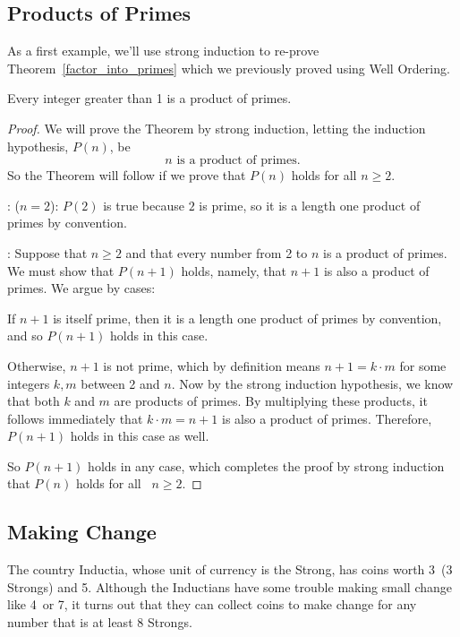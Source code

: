 \subsection{Products of Primes}

As a first example, we'll use strong induction to re-prove
Theorem~\ref{factor_into_primes} which we previously proved using Well
Ordering.

\begin{theorem*}%
Every integer greater than 1 is a product of primes.
\end{theorem*}

\begin{proof}
We will prove the Theorem by strong induction, letting the induction 
hypothesis, $P(n)$, be
\[
n \text{ is a product of primes}.
\]
So the Theorem will follow if we prove that $P(n)$ holds for all $n
\geq 2$.

: ($n=2$): $P(2)$ is true because $2$ is prime, so it is
a length one product of primes by convention.

: Suppose that $n \geq 2$ and that every
number from 2 to $n$ is a product of primes.  We must show that
$P(n+1)$ holds, namely, that $n+1$ is also a product of primes.  We
argue by cases:

If $n+1$ is itself prime, then it is a length one product of primes by
convention, and so $P(n+1)$ holds in this case.

Otherwise, $n + 1$ is not prime, which by definition means $n+1 =
k\cdot m$ for some integers $k,m$ between 2 and $n$.  Now by the
strong induction hypothesis, we know that both $k$ and $m$ are
products of primes.  By multiplying these products, it follows
immediately that $k\cdot m = n+1$ is also a product of primes.
Therefore, $P(n+1)$ holds in this case as well.

So $P(n+1)$ holds in any case, which completes the proof by strong
induction that $P(n)$ holds for all ~$n \ge 2$.

\end{proof}

\subsection{Making Change}

The country Inductia, whose unit of currency is the Strong, has coins
worth 3\sg\ (3 Strongs) and 5\sg.  Although the Inductians have some
trouble making small change like 4\sg\ or 7\sg, it turns out that they
can collect coins to make change for any number that is at least 8
Strongs.

